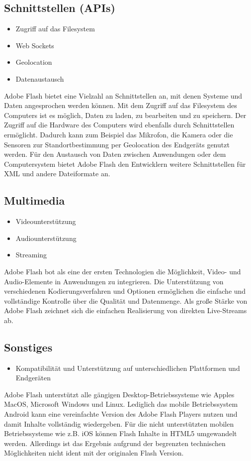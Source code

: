 \subsection{Schnittstellen (APIs)}
\begin{itemize}
	\item{Zugriff auf das Filesystem}
	\item{Web Sockets}
	\item{Geolocation}
	\item{Datenaustausch}
\end{itemize}
Adobe Flash bietet eine Vielzahl an Schnittstellen an, mit denen Systeme und
Daten angesprochen werden können. Mit dem Zugriff auf das Filesystem des
Computers ist es möglich, Daten zu laden, zu bearbeiten und zu speichern. Der
Zugriff auf die Hardware des Computers wird ebenfalls durch Schnittstellen
ermöglicht. Dadurch kann zum Beispiel das Mikrofon, die Kamera oder die
Sensoren zur Standortbestimmung per Geolocation des Endgeräts genutzt werden.
Für den Austausch von Daten zwischen Anwendungen oder dem Computersystem bietet
Adobe Flash den Entwicklern weitere Schnittstellen für XML und andere
Dateiformate an.

\subsection{Multimedia}
\begin{itemize}
	\item{Videounterstützung}
	\item{Audiounterstützung}
	\item{Streaming}
\end{itemize}
Adobe Flash bot als eine der ersten Technologien die Möglichkeit, Video- und
Audio-Elemente in Anwendungen zu integrieren. Die Unterstützung von
verschiedenen Kodierungsverfahren und Optionen ermöglichen die einfache und
vollständige Kontrolle über die Qualität und Datenmenge. Als große Stärke
von Adobe Flash zeichnet sich die einfachen Realisierung von direkten
Live-Streams ab.

\subsection{Sonstiges}
\begin{itemize}
	\item{
	Kompatibilität und Unterstützung auf unterschiedlichen Plattformen und
	Endgeräten
	}
\end{itemize}
Adobe Flash unterstützt alle gängigen Desktop-Betriebssysteme wie Apples
MacOS, Microsoft Windows und Linux. Lediglich das mobile Betriebssystem
Android kann eine vereinfachte Version des Adobe Flash Players nutzen und
damit Inhalte vollständig wiedergeben. Für die nicht unterstützten mobilen
Betriebssysteme wie z.B. iOS können Flash Inhalte in HTML5 umgewandelt werden.
Allerdings ist das Ergebnis aufgrund der begrenzten technischen Möglichkeiten
nicht ident mit der originalen Flash Version.

